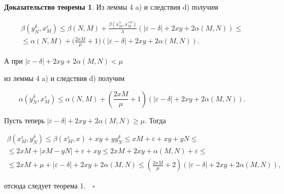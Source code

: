 {\bf Доказательство теоремы 1}. Из леммы 4 a) и следствия d) получим


\begin{multline*}


\beta (y_{N}^{\delta },x_{M}^{\varepsilon }) \leq \beta (N,M) +


\frac{\beta (x_{M}^{\lambda },x_{M}^{+ 0})}{\lambda }


(|\varepsilon - \delta | + 2xy + 2\alpha (M,N)) \leq \\


\le\alpha (N,M) + \bigg(\frac{2xM}{\mu } + 1\bigg)(|\varepsilon - \delta |


+ 2xy + 2\alpha (M,N)).


\end{multline*}


А при $|\varepsilon - \delta | + 2xy + 2\alpha (M,N) < \mu $ 


из леммы 4 a) и следствия d) получим


$$


\alpha (y_{N}^{\delta },x_{M}^{\varepsilon }) \leq \alpha (N,M) +


(\frac{2xM}{\mu } + 1)(|\varepsilon - \delta | + 2xy + 2\alpha (M,N)). 


$$





Пусть теперь $|\varepsilon - \delta | + 2xy + 2\alpha (M,N) \geq \mu$. Тогда


\begin{multline*}


\beta (x_{M}^{\varepsilon },y_{N}^{\delta }) \leq


\beta (x_{M}^{\varepsilon },x) + xy + yy_{N}^{\delta } \leq 


xM + \varepsilon + xy + yN \leq \\


\le 2xM + |xM - yN| + \varepsilon + xy \leq


2xM + 2xy + \alpha (M,N) + \varepsilon \leq \\


\le 2xM + \mu + |\varepsilon - \delta | + 2xy + 2\alpha (M,N) \leq


(\frac{2xM}{\mu } + 2)(|\varepsilon - \delta | + 2xy + 2\alpha (M,N)),


\end{multline*}


отсюда следует теорема 1$.\quad\square$


\medskip





